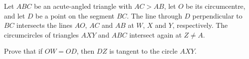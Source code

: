 Let $ABC$ be an acute-angled triangle with $AC > AB$, let $O$ be its circumcentre, and let $D$ be a point on the segment $BC$. The line through $D$ perpendicular to $BC$ intersects the lines $AO$, $AC$ and $AB$ at $W$, $X$ and $Y$, respectively. The circumcircles of triangles $AXY$ and $ABC$ intersect again at $Z \neq A$.

Prove that if $OW = OD$, then $DZ$ is tangent to the circle $AXY$.
